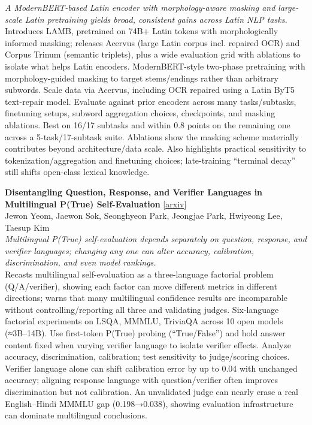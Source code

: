 \documentclass[12pt,letterpaper]{article}
\begin{document}
{\small\textit{A ModernBERT-based Latin encoder with morphology-aware masking and large-scale Latin pretraining yields broad, consistent gains across Latin NLP tasks.}}\\[1pt]
{\footnotesize Introduces LAMB, pretrained on 74B+ Latin tokens with morphologically informed masking; releases Acervus (large Latin corpus incl. repaired OCR) and Corpus Trinum (semantic triplets), plus a wide evaluation grid with ablations to isolate what helps Latin encoders. ModernBERT-style two-phase pretraining with morphology-guided masking to target stems/endings rather than arbitrary subwords. Scale data via Acervus, including OCR repaired using a Latin ByT5 text-repair model. Evaluate against prior encoders across many tasks/subtasks, finetuning setups, subword aggregation choices, checkpoints, and masking ablations. Best on 16/17 subtasks and within 0.8 points on the remaining one across a 5-task/17-subtask suite. Ablations show the masking scheme materially contributes beyond architecture/data scale. Also highlights practical sensitivity to tokenization/aggregation and finetuning choices; late-training ``terminal decay'' still shifts open-class lexical knowledge.}

\medskip

{\small\textbf{Disentangling Question, Response, and Verifier Languages in Multilingual P(True) Self-Evaluation}} {\scriptsize[\href{https://arxiv.org/abs/2610.32144}{arxiv}]}\\
{\scriptsize Jewon Yeom, Jaewon Sok, Seonghyeon Park, Jeongjae Park, Hwiyeong Lee, Taesup Kim}\\

{\small\textit{Multilingual P(True) self-evaluation depends separately on question, response, and verifier languages; changing any one can alter accuracy, calibration, discrimination, and even model rankings.}}\\[1pt]
{\footnotesize Recasts multilingual self-evaluation as a three-language factorial problem (Q/A/verifier), showing each factor can move different metrics in different directions; warns that many multilingual confidence results are incomparable without controlling/reporting all three and validating judges. Six-language factorial experiments on LSQA, MMMLU, TriviaQA across 10 open models (≈3B--14B). Use first-token P(True) probing (``True/False'') and hold answer content fixed when varying verifier language to isolate verifier effects. Analyze accuracy, discrimination, calibration; test sensitivity to judge/scoring choices. Verifier language alone can shift calibration error by up to 0.04 with unchanged accuracy; aligning response language with question/verifier often improves discrimination but not calibration. An unvalidated judge can nearly erase a real English--Hindi MMMLU gap (0.198→0.038), showing evaluation infrastructure can dominate multilingual conclusions.}
\end{document}
